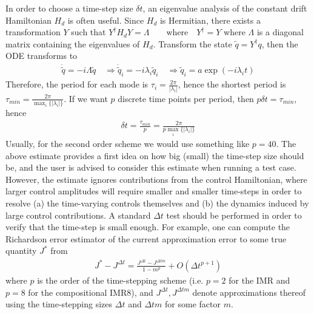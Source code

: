 \documentclass[11pt]{article}
\begin{document}
    In order to choose a time-step size $\delta t$, an eigenvalue analysis of
    the constant drift Hamiltonian $H_d$ is often useful. Since $H_d$ is Hermitian, there exists a transformation $Y$ such that $Y^{\dagger}H_d Y = \Lambda \qquad  \text{where} \quad Y^{\dagger} = Y$ where $\Lambda$ is a diagonal matrix containing the eigenvalues of $H_d$.
       Transform the state $\tilde q = Y^{\dagger} q$, then the ODE transforms to 
       \begin{align*}
         \dot \tilde q = -i \Lambda \tilde q \quad \Rightarrow \dot \tilde q_i =
         -i\lambda_i \tilde q_i \quad \Rightarrow \tilde q_i = a
         \exp(-i\lambda_i t)
       \end{align*}
       Therefore, the period for each mode is $\tau_i =
       \frac{2\pi}{|\lambda_i|}$, hence the shortest period is $\tau_{min} =
       \frac{2\pi}{\max_i\{|\lambda_i|\}}$. If we want $p$ discrete time points
       per period, then $p\delta t = \tau_{min}$, hence 
       \begin{align} \label{eq:timestepsize}
         \delta t = \frac{\tau_{min}}{p} = \frac{2\pi}{p\max_i\{|\lambda_i|\}}
       \end{align}
       Usually, for the second order scheme we would use something like $p=40$. The above estimate provides a first idea on how big (small) the time-step size should be, and the user is advised to consider this estimate when running a test case. However, the estimate ignores contributions from the control Hamiltonian, where larger control amplitudes will require smaller and smaller time-steps in order to resolve (a) the time-varying controls themselves and (b) the dynamics induced by large control contributions. A standard $\Delta t$ test should be performed in order to verify that the time-step is small enough. For example, one can compute the Richardson error estimator of the current approximation error to some true quantity $J^*$ from
       \begin{align}
         J^* - J^{\Delta t} = \frac{J^{\Delta t} - J^{\Delta t m}}{1-m^p} + O(\Delta t^{p+1})
       \end{align}
       where $p$ is the order of the time-stepping scheme (i.e. $p=2$ for the IMR and $p=8$ for the compositional IMR8), and $J^{\Delta t}, J^{\Delta tm}$ denote approximations thereof using the time-stepping sizes $\Delta t$ and $\Delta t m$ for some factor $m$.        
       
\end{document}
